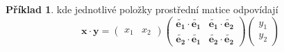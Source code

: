 \documentclass[a5paper,12pt]{amsbook}
\theoremstyle{definition}
\newtheorem{example}{Příklad}[chapter]
\newcommand{\myvec}[1]{\bm{#1}}
\begin{document}
\begin{example}
kde jednotlivé položky prostřední matice odpovídají
\begin{equation*}
\myvec{x}\cdot\myvec{y} =
\left(\begin{array}{cc}x_1 & x_2\end{array}\right)
\left(\begin{array}{cc}
  \myvec{\widetilde{e_1}}\cdot\myvec{\widetilde{e_1}} &
  \myvec{\widetilde{e_1}}\cdot\myvec{\widetilde{e_2}} \\
  \myvec{\widetilde{e_2}}\cdot\myvec{\widetilde{e_1}} &
  \myvec{\widetilde{e_2}}\cdot\myvec{\widetilde{e_2}}
\end{array}\right)
\left(\begin{array}{c}y_1 \\ y_2\end{array}\right)
\end{equation*}


\end{example}
\end{document}
